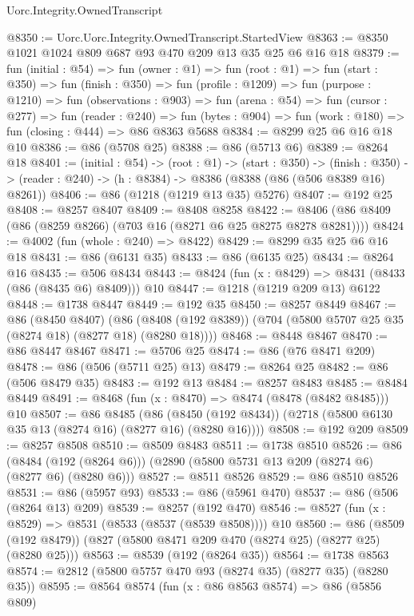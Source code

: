 \begin{lexlean}{Uorc.Integrity.OwnedTranscript}
\begin{coremodule}
@8350 := Uorc.Uorc.Integrity.OwnedTranscript.StartedView
@8363 := @8350 @1021 @1024 @809 @687 @93 @470 @209 @13 @35 @25 @6 @16 @18
@8379 := fun (initial : @54) =>
  fun (owner : @1) =>
  fun (root : @1) =>
  fun (start : @350) =>
  fun (finish : @350) =>
  fun (profile : @1209) =>
  fun (purpose : @1210) =>
  fun (observations : @903) =>
  fun (arena : @54) =>
  fun (cursor : @277) =>
  fun (reader : @240) =>
  fun (bytes : @904) => fun (work : @180) => fun (closing : @444) => @86 @8363 @5688
@8384 := @8299 @25 @6 @16 @18 @10
@8386 := @86 (@5708 @25)
@8388 := @86 (@5713 @6)
@8389 := @8264 @18
@8401 := (initial : @54) ->
  (root : @1) ->
  (start : @350) ->
  (finish : @350) -> (reader : @240) -> (h : @8384) -> @8386 (@8388 (@86 (@506 @8389 @16) @8261))
@8406 := @86 (@1218 (@1219 @13 @35) @5276)
@8407 := @192 @25
@8408 := @8257 @8407
@8409 := @8408 @8258
@8422 := @8406 (@86 @8409 (@86 (@8259 @8266) (@703 @16 (@8271 @6 @25 @8275 @8278 @8281))))
@8424 := @4002 (fun (whole : @240) => @8422)
@8429 := @8299 @35 @25 @6 @16 @18
@8431 := @86 (@6131 @35)
@8433 := @86 (@6135 @25)
@8434 := @8264 @16
@8435 := @506 @8434
@8443 := @8424 (fun (x : @8429) => @8431 (@8433 (@86 (@8435 @6) @8409))) @10
@8447 := @1218 (@1219 @209 @13) @6122
@8448 := @1738 @8447
@8449 := @192 @35
@8450 := @8257 @8449
@8467 := @86
    (@8450 @8407)
    (@86 (@8408 (@192 @8389)) (@704 (@5800 @5707 @25 @35 (@8274 @18) (@8277 @18) (@8280 @18))))
@8468 := @8448 @8467
@8470 := @86 @8447 @8467
@8471 := @5706 @25
@8474 := @86 (@76 @8471 @209)
@8478 := @86 (@506 (@5711 @25) @13)
@8479 := @8264 @25
@8482 := @86 (@506 @8479 @35)
@8483 := @192 @13
@8484 := @8257 @8483
@8485 := @8484 @8449
@8491 := @8468 (fun (x : @8470) => @8474 (@8478 (@8482 @8485))) @10
@8507 := @86
    @8485
    (@86 (@8450 (@192 @8434)) (@2718 (@5800 @6130 @35 @13 (@8274 @16) (@8277 @16) (@8280 @16))))
@8508 := @192 @209
@8509 := @8257 @8508
@8510 := @8509 @8483
@8511 := @1738 @8510
@8526 := @86
    (@8484 (@192 (@8264 @6)))
    (@2890 (@5800 @5731 @13 @209 (@8274 @6) (@8277 @6) (@8280 @6)))
@8527 := @8511 @8526
@8529 := @86 @8510 @8526
@8531 := @86 (@5957 @93)
@8533 := @86 (@5961 @470)
@8537 := @86 (@506 (@8264 @13) @209)
@8539 := @8257 (@192 @470)
@8546 := @8527 (fun (x : @8529) => @8531 (@8533 (@8537 (@8539 @8508)))) @10
@8560 := @86 (@8509 (@192 @8479)) (@827 (@5800 @8471 @209 @470 (@8274 @25) (@8277 @25) (@8280 @25)))
@8563 := @8539 (@192 (@8264 @35))
@8564 := @1738 @8563
@8574 := @2812 (@5800 @5757 @470 @93 (@8274 @35) (@8277 @35) (@8280 @35))
@8595 := @8564
    @8574
    (fun (x : @86 @8563 @8574) =>
    @86
      (@5856 @809)

\end{coremodule}
\end{lexlean}
